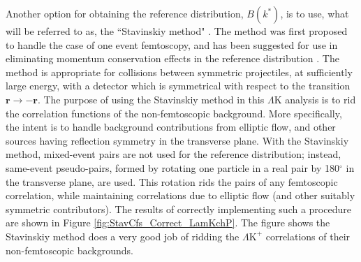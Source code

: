 \documentclass[ALICE,manyauthors]{cernphprep}
\newcommand{\LamK}{$\Lambda$K\xspace}
\newcommand{\LamKchP}{$\Lambda\mathrm{K^{+}}$\xspace}
\newcommand{\LamKchPALamKchM}{$\Lambda\mathrm{K^{+}}$($\bar{\Lambda}\mathrm{K^{-}}$)\xspace}
\begin{document}
Another option for obtaining the reference distribution, $B(k^{*})$, is to use, what will be referred to as, the ``Stavinskiy method" \cite{Stavinskiy04}.
The method was first proposed to handle the case of one event femtoscopy, and has been suggested for use in eliminating momentum conservation effects in the reference distribution \cite{Lisa:2005dd}.
The method is appropriate for collisions between symmetric projectiles, at sufficiently large energy, with a detector which is symmetrical with respect to the transition $\mathbf{r} \rightarrow \mathbf{-r}$.
The purpose of using the Stavinskiy method in this \LamK analysis is to rid the correlation functions of the non-femtoscopic background.  
More specifically, the intent is to handle background contributions from elliptic flow, and other sources having reflection symmetry in the transverse plane.  
With the Stavinskiy method, mixed-event pairs are not used for the reference distribution; instead, same-event pseudo-pairs, formed by rotating one particle in a real pair by 180$^\circ$ in the transverse plane, are used.  
This rotation rids the pairs of any femtoscopic correlation, while maintaining correlations due to elliptic flow (and other suitably symmetric contributors).
The results of correctly implementing such a procedure are shown in Figure \ref{fig:StavCfs_Correct_LamKchP}.  
The figure shows the Stavinskiy method does a very good job of ridding the \LamKchP correlations of their non-femtoscopic backgrounds.  

\begin{comment}
\begin{figure}[h!]
  \centering
  \texttt{[image: /home/jesse/Analysis/FemtoAnalysis/AnalysisNotes/4\_CorrelationFunctions/Figures/OnlyTwo/canKStarCfsLamKchPwConj\_20180505vs20180505StavCf\_CustomRebin.pdf]}
  \caption[\LamKchP Stavinskiy Correlation Functions]
  {
  \LamKchPALamKchM correlation functions built using the Stavinskiy method for 0--10\%, 10--30\%, and 30--50\% centralities.  
  Closed (red) symbols represent correlations built using the normal mixed-event reference distribution, while open (green) symbols represent correlations formed using the Stavinskiy same-event pseudo-pairs as a reference.
  }
  \label{fig:StavCfs_Correct_LamKchP}
\end{figure}
\end{comment}
\end{document}
